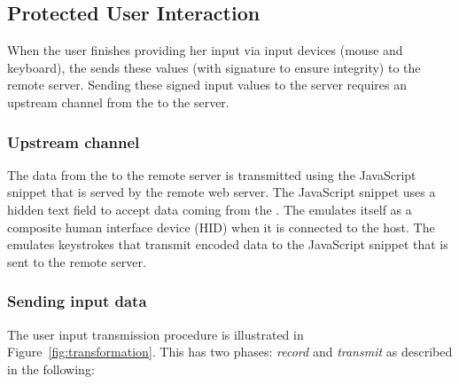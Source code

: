 

\subsection{Protected User Interaction}
\label{sec:systemDesign:commit}

When the user finishes providing her input via input devices (mouse and keyboard), the \device sends these values (with signature to ensure integrity) to the remote server. Sending these signed input values to the server requires an upstream channel from the \device to the server.

\subsubsection{\bfseries Upstream channel}\label{sec:systemDesign:commit:upload} The data from the \device to the remote server is transmitted using the \name JavaScript snippet that is served by the remote web server. The \name JavaScript snippet uses a hidden text field to accept data coming from the \device. The \device emulates itself as a composite human interface device (HID) when it is connected to the host. The \device emulates keystrokes that transmit encoded data to the \name JavaScript snippet that is sent to the remote server.

\subsubsection{\bfseries Sending input data}\label{sec:systemDesign:commit:send}
The user input transmission procedure is illustrated in Figure~\ref{fig:transformation}. This has two phases: \emph{record} and \emph{transmit} as described in the following:

